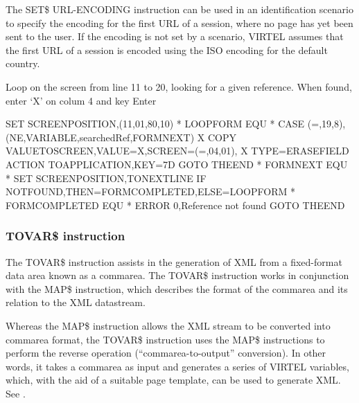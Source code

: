 \documentclass[letterpaper,10pt,english]{sphinxmanual}
\begin{document}
The SET\$ URL-ENCODING instruction can be used in an identification scenario to specify the encoding for the first URL
of a session, where no page has yet been sent to the user. If the encoding is not set by a scenario, VIRTEL assumes that
the first URL of a session is encoded using the ISO encoding for the default country.


Loop on the screen from line 11 to 20, looking for a given reference. When found, enter ‘X’ on colum 4 and key Enter

\begin{sphinxVerbatim}[commandchars=\\\{\}]
            SET\PYGZdl{} SCREEN\PYGZhy{}POSITION,(11,01,80,10)
*
LOOP\PYGZus{}FORM   EQU *
            CASE\PYGZdl{} (=,19,8),(NE,VARIABLE,\PYGZsq{}searchedRef\PYGZsq{},FORM\PYGZus{}NEXT)         X
            COPY\PYGZdl{} VALUE\PYGZhy{}TO\PYGZhy{}SCREEN,VALUE=\PYGZsq{}X\PYGZsq{},SCREEN=(=,04,01),            X
                TYPE=ERASE\PYGZhy{}FIELD
            ACTION\PYGZdl{} TO\PYGZhy{}APPLICATION,KEY=7D
            GOTO\PYGZdl{} THEEND
*
FORM\PYGZus{}NEXT EQU *
            SET\PYGZdl{} SCREEN\PYGZhy{}POSITION,TO\PYGZhy{}NEXT\PYGZhy{}LINE
            IF\PYGZdl{} NOT\PYGZhy{}FOUND,THEN=FORM\PYGZus{}COMPLETED,ELSE=LOOP\PYGZus{}FORM
*
FORM\PYGZus{}COMPLETED EQU *
            ERROR\PYGZdl{} 0,\PYGZsq{}Reference not found\PYGZsq{}
            GOTO\PYGZdl{} THEEND
\end{sphinxVerbatim}


\subsubsection{TOVAR\$ instruction}
\label{\detokenize{User_Guide:v457ug-tovar}}\label{\detokenize{User_Guide:tovar-instruction}}
The TOVAR\$ instruction assists in the generation of XML from a fixed-format data area known as a commarea. The
TOVAR\$ instruction works in conjunction with the MAP\$ instruction, which describes the format of the commarea and
its relation to the XML datastream.

Whereas the MAP\$ instruction allows the XML stream to be converted into commarea format, the TOVAR\$ instruction
uses the MAP\$ instructions to perform the reverse operation (“commarea-to-output” conversion). In other words, it
takes a commarea as input and generates a series of VIRTEL variables, which, with the aid of a suitable page template,
can be used to generate XML. See {\hyperref[\detokenize{User_Guide:v457ug-xml-parser}]{}}.
\end{document}
